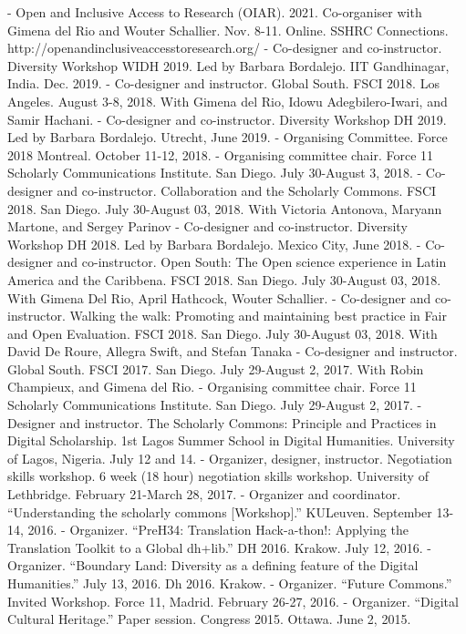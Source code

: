 - Open and Inclusive Access to Research (OIAR). 2021. Co-organiser with Gimena del Rio and Wouter Schallier. Nov. 8-11. Online. SSHRC Connections. http:/\allowbreak{}/\allowbreak{}openandinclusiveaccesstoresearch.org/\allowbreak{}
- Co-designer and co-instructor. Diversity Workshop WIDH 2019. Led by Barbara Bordalejo. IIT Gandhinagar, India. Dec. 2019.
- Co-designer and instructor. Global South. FSCI 2018. Los Angeles. August 3-8, 2018. With Gimena del Rio, Idowu Adegbilero-Iwari, and Samir Hachani.
- Co-designer and co-instructor. Diversity Workshop DH 2019. Led by Barbara Bordalejo. Utrecht, June 2019.
- Organising Committee. Force 2018 Montreal. October 11-12, 2018.
- Organising committee chair. Force 11 Scholarly Communications Institute. San Diego. July 30-August 3, 2018.
- Co-designer and co-instructor. Collaboration and the Scholarly Commons. FSCI 2018. San Diego. July 30-August 03, 2018. With Victoria Antonova, Maryann Martone, and Sergey Parinov
- Co-designer and co-instructor. Diversity Workshop DH 2018. Led by Barbara Bordalejo. Mexico City, June 2018.
- Co-designer and co-instructor. Open South: The Open science experience in Latin America and the Caribbena. FSCI 2018. San Diego. July 30-August 03, 2018. With Gimena Del Rio, April Hathcock, Wouter Schallier.
- Co-designer and co-instructor. Walking the walk: Promoting and maintaining best practice in Fair and Open Evaluation. FSCI 2018. San Diego. July 30-August 03, 2018. With David De Roure, Allegra Swift, and Stefan Tanaka
- Co-designer and instructor. Global South. FSCI 2017. San Diego. July 29-August 2, 2017. With Robin Champieux, and Gimena del Rio.
- Organising committee chair. Force 11 Scholarly Communications Institute. San Diego. July 29-August 2, 2017.
- Designer and instructor. The Scholarly Commons: Principle and Practices in Digital Scholarship.  1st Lagos Summer School in Digital Humanities. University of Lagos, Nigeria. July 12 and 14.
- Organizer, designer, instructor. Negotiation skills workshop. 6 week (18 hour) negotiation skills workshop. University of Lethbridge. February 21-March 28, 2017.
- Organizer and coordinator. “Understanding the scholarly commons [Workshop].” KULeuven. September 13-14, 2016.
- Organizer. “PreH34: Translation Hack-a-thon!: Applying the Translation Toolkit to a Global dh+lib.” DH 2016. Krakow. July 12, 2016.
- Organizer. “Boundary Land: Diversity as a defining feature of the Digital Humanities.” July 13, 2016. Dh 2016. Krakow.
- Organizer. “Future Commons.” Invited Workshop. Force 11, Madrid. February 26-27, 2016.
- Organizer. “Digital Cultural Heritage.” Paper session. Congress 2015. Ottawa. June 2, 2015.
